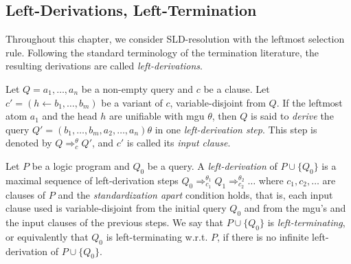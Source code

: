 \subsection{Left-Derivations, Left-Termination}
Throughout this chapter, we consider SLD-resolution with the
leftmost selection rule. Following the standard terminology
of the termination literature, the resulting derivations are
called \emph{left-derivations}.

Let $Q = a_1, \ldots, a_n$ be a non-empty query and $c$ be a clause.
Let $c' = (h \leftarrow b_1, \ldots, b_m)$ be a variant of $c$,
variable-disjoint from $Q$. If the leftmost atom $a_1$ and the head
$h$ are unifiable with mgu $\theta$, then $Q$ is said to \emph{derive}
the query $Q' = (b_1, \ldots, b_m, a_2, \ldots, a_n)\theta$
in one \emph{left-derivation step}. This step is denoted by
$Q \Rightarrow_c^{\theta} Q'$,
and $c'$ is called its \emph{input clause}.

Let $P$ be a logic program and $Q_0$ be a query. A \emph{left-derivation} of
$P \cup \{Q_0\}$ is a maximal sequence of left-derivation steps
$Q_0 \Rightarrow_{c_1}^{\theta_1} Q_1 \Rightarrow_{c_2}^{\theta_2} \ldots$
where $c_1,c_2, \ldots$ are clauses of $P$ and the \emph{standardization apart}
condition holds, that is, each input clause used is variable-disjoint from the
initial query $Q_0$ and from the mgu's and the input clauses of the previous steps.
%
We say that $P \cup \{Q_0\}$ is \emph{left-terminating}, or equivalently
that $Q_0$ is left-terminating w.r.t. $P$, if there is no infinite
left-derivation of $P \cup \{Q_0\}$.

